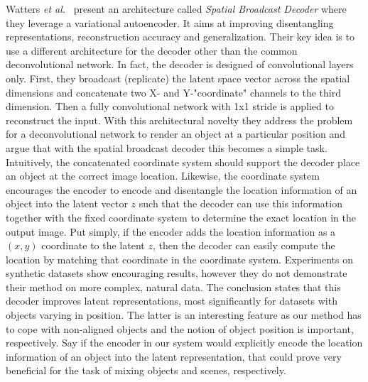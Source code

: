 \documentclass[12pt,a4paper]{article}
\begin{document}
\par Watters \textit{et al.}~\cite{SpatialBDecoder} present an architecture called \textit{Spatial Broadcast Decoder} where they leverage a variational autoencoder. It aims at improving disentangling representations, reconstruction accuracy and generalization. Their key idea is to use a different architecture for the decoder other than the common deconvolutional network. In fact, the decoder is designed of convolutional layers only. First, they broadcast (replicate) the latent space vector across the spatial dimensions and concatenate two X- and Y-"coordinate" channels to the third dimension. Then a fully convolutional network with 1x1 stride is applied to reconstruct the input. With this architectural novelty they address the problem for a deconvolutional network to render an object at a particular position and argue that with the spatial broadcast decoder this becomes a simple task. Intuitively, the concatenated coordinate system should support the decoder place an object at the correct image location. Likewise, the coordinate system encourages the encoder to encode and disentangle the location information of an object into the latent vector $z$ such that the decoder can use this information together with the fixed coordinate system to determine the exact location in the output image. Put simply, if the encoder adds the location information as a $(x,y)$ coordinate to the latent $z$, then the decoder can easily compute the location by matching that coordinate in the coordinate system. Experiments on synthetic datasets show encouraging results, however they do not demonstrate their method on more complex, natural data. The conclusion states that this decoder improves latent representations, most significantly for datasets with objects varying in position. The latter is an interesting feature as our method has to cope with non-aligned objects and the notion of object position is important, respectively. Say if the encoder in our system would explicitly encode the location information of an object into the latent representation, that could prove very beneficial for the task of mixing objects and scenes, respectively.
\end{document}
